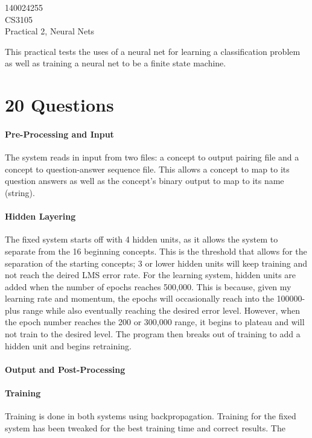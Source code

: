 \documentclass[12pt]{article}
\begin{document}
\begin{flushright}
140024255\\
CS3105\\
Practical 2, Neural Nets
\end{flushright}

This practical tests the uses of a neural net for learning a classification problem as well as training a neural net to be a finite state machine.

\section{20 Questions}
\paragraph*{Pre-Processing and Input}
The system reads in input from two files: a concept to output pairing file and a concept to question-answer sequence file. This allows a concept to map to its question answers as well as the concept's binary output to map to its name (string).

\paragraph*{Hidden Layering}
The fixed system starts off with 4 hidden units, as it allows the system to separate from the 16 beginning concepts. This is the threshold that allows for the separation of the starting concepts; 3 or lower hidden units will keep training and not reach the deired LMS error rate. For the learning system, hidden units are added when the number of epochs reaches 500,000. This is because, given my learning rate and momentum, the epochs will occasionally reach into the 100000-plus range while also eventually reaching the desired error level. However, when the epoch number reaches the 200 or 300,000 range, it begins to plateau and will not train to the desired level. The program then breaks out of training to add a hidden unit and begins retraining.

\paragraph*{Output and Post-Processing}

\paragraph*{Training}
Training is done in both systems using backpropagation. Training for the fixed system has been tweaked for the best training time and correct results. The 
\end{document}
